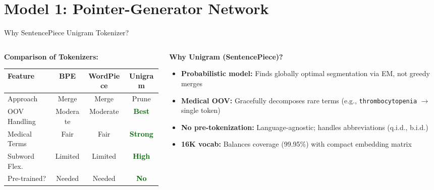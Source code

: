 \documentclass[10pt, aspectratio=169]{beamer}
\begin{document}
\section{Model 1: Pointer-Generator Network}

\begin{frame}{Why SentencePiece Unigram Tokenizer?}
  \footnotesize
  \begin{columns}[T]
    \begin{column}{0.48\textwidth}
      \textbf{Comparison of Tokenizers:}
      \begin{table}
        \centering
        \scriptsize
        \renewcommand{\arraystretch}{1.15}
        \begin{tabular}{l|ccc}
          \toprule
          \textbf{Feature} & \textbf{BPE} & \textbf{WordPiece} & \textbf{Unigram} \\
          \midrule
          Approach & Merge & Merge & Prune \\
          OOV Handling & Moderate & Moderate & \textcolor{darkgreen}{\textbf{Best}} \\
          Medical Terms & Fair & Fair & \textcolor{darkgreen}{\textbf{Strong}} \\
          Subword Flex. & Limited & Limited & \textcolor{darkgreen}{\textbf{High}} \\
          Pre-trained? & Needed & Needed & \textcolor{darkgreen}{\textbf{No}} \\
          \bottomrule
        \end{tabular}
      \end{table}
    \end{column}
    \begin{column}{0.48\textwidth}
      \textbf{Why Unigram (SentencePiece)?}
      \begin{itemize}\setlength{\itemsep}{0pt}
        \item \textbf{Probabilistic model:} Finds globally optimal segmentation via EM, not greedy merges
        \item \textbf{Medical OOV:} Gracefully decomposes rare terms (e.g., \texttt{thrombocytopenia} $\rightarrow$ single token)
        \item \textbf{No pre-tokenization:} Language-agnostic; handles abbreviations (q.i.d., b.i.d.)
        \item \textbf{16K vocab:} Balances coverage (99.95\%) with compact embedding matrix
      \end{itemize}


\end{column}
\end{columns}
\end{frame}
\end{document}
